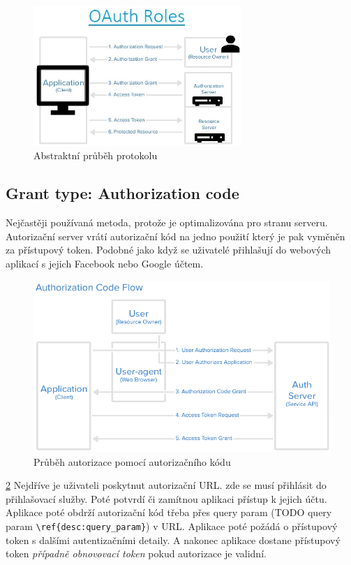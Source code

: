 \begin{figure}[H]
    \centering
    \includegraphics[width=0.7\textwidth]{figures/OAuth_abstract_flow.png}
    \caption{Abstraktní průběh protokolu}%
    \label{fig:Oauth_roles_diagram}
\end{figure}

\subsection{Grant type: Authorization code}
Nejčastěji používaná metoda, protože je optimalizována pro stranu serveru. Autorizační server vrátí autorizační kód na jedno použití který je pak vyměněn za přístupový token. Podobné jako když se uživatelé přihlašují do webových aplikací s jejich Facebook nebo Google účtem.

\begin{figure}[ht]
    \centering
    \includegraphics[width=\textwidth]{figures/OAuth_code_flow.png}
    \caption[short]{Průběh autorizace pomocí autorizačního kódu}%
    \label{fig:Oauth_auth_flow}
\end{figure}


\ref{fig:Oauth_auth_flow} Nejdříve je uživateli poskytnut autorizační URL. zde se musí přihlásit do přihlašovací služby. Poté potvrdí či zamítnou aplikaci přístup k jejich účtu. Aplikace poté obdrží autorizační kód třeba přes query param (TODO query param \verb|\ref{desc:query_param}|) v URL. Aplikace poté požádá o přístupový token s dalšími autentizačními detaily. A nakonec aplikace dostane přístupový token \textit{případně obnovovací token} pokud autorizace je validní.


